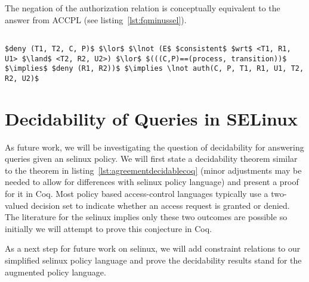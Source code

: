 The negation of the authorization relation  is conceptually equivalent to the  answer from \ac{ACCPL} (see listing~\ref{lst:fqminussel}).

\lstset{mathescape, language=AST} 
\begin{lstlisting}[frame=single, caption={\syn{NotPermitted} for \ac{selinux}},label={lst:fqminussel}]

$deny (T1, T2, C, P)$ $\lor$ $\lnot (E$ $consistent$ $wrt$ <T1, R1, U1> $\land$ <T2, R2, U2>) $\lor$ $(((C,P)==(process, transition))$ $\implies$ $deny (R1, R2))$ $\implies \lnot auth(C, P, T1, R1, U1, T2, R2, U2)$ 

\end{lstlisting}

\section{Decidability of Queries in SELinux}

As future work, we will be investigating the question of decidability for answering queries given an \ac{selinux} policy. We will first state a decidability theorem similar to the theorem in listing~\ref{lst:agreementdecidablecoq} (minor adjustments may be needed to allow for differences with \ac{selinux} policy language) and present a proof for it in Coq. Most policy based access-control languages typically use a two-valued decision set to indicate whether an access request is granted or denied. The literature for the \ac{selinux} implies only these two outcomes are possible so initially we will attempt to prove this conjecture in Coq. 

As a next step for future work on \ac{selinux}, we will add constraint relations to our simplified \ac{selinux} policy language and prove the decidability results stand for the augmented policy language.
